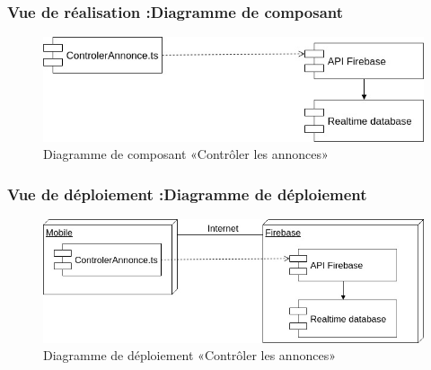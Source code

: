 \documentclass[11pt,a4paper,oneside]{book}
\begin{document}
					\subsubsection{Vue de réalisation :Diagramme de composant}
					\begin{figure}[H]
						\centering
						\includegraphics[width=1\textwidth]{Images/ch3/ComposantControlerAnnonce}
						\caption{Diagramme de composant «Contrôler les annonces»
						}
						\label{fig:composantcontrolerannonce}
					\end{figure}
					
					\subsubsection{Vue de déploiement :Diagramme de déploiement}
					\begin{figure}[H]
						\centering
						\includegraphics[width=1\textwidth]{Images/ch3/deploimentControleAnnonce}
						\caption{Diagramme de déploiement «Contrôler les annonces»
						}
						\label{fig:deploimentcontroleannonce}
					\end{figure}
				\vfill
				\vspace{30cm}
\end{document}
